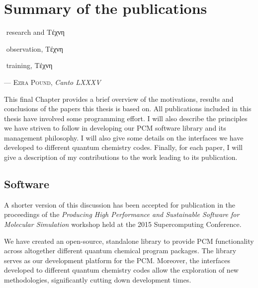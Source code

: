 \chapter{Summary of the publications}\label{ch:publications-summary}

\epigraph{\textonehalf\,\,research \kern 20pt and \textonehalf \kern 20pt \textgreek{Tέχνη}

          \textonehalf\,\,observation, \kern 22pt \textonehalf \kern 20pt \textgreek{Tέχνη}

          \textonehalf\,\,training, \kern 39pt \textonehalf \kern 20pt \textgreek{Tέχνη}
          }{
  --- \textsc{Ezra Pound}, \textit{Canto LXXXV}}

This final Chapter provides a brief overview of the motivations, results and
conclusions of the papers this thesis is based on.
All publications included in this thesis have involved some programming effort.
I will also describe the principles we have striven to follow in developing our
\acs{PCM} software library and its management philosophy.
I will also give some details on the interfaces we have developed to different
quantum chemistry codes.
Finally, for each paper, I will give a description of my contributions to the
work leading to its publication.

\pagebreak

\section*{Software}


A shorter version of this discussion has been accepted for publication in the
proceedings of the \emph{Producing High Performance and Sustainable Software
for Molecular Simulation} workshop held at the 2015 Supercomputing Conference.

We have created an open-source, standalone library to provide \acs{PCM} functionality across
altogether different quantum chemical program packages.
The library serves as our development platform for the \acs{PCM}.
Moreover, the interfaces developed to different quantum chemistry codes allow the exploration
of new methodologies, significantly cutting down development times.

